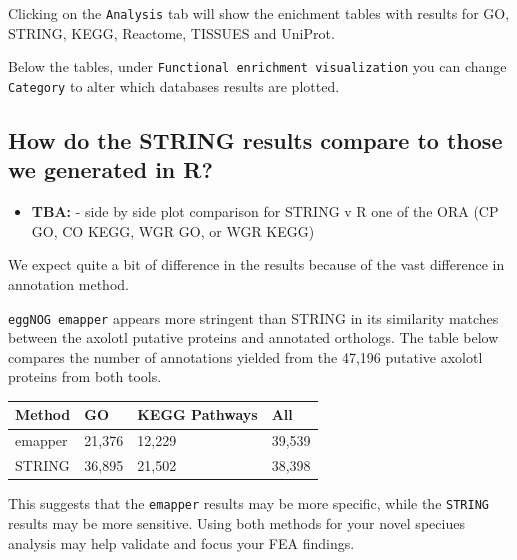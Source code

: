 \documentclass[
]{book}
\providecommand{\tightlist}{%
  \setlength{\itemsep}{0pt}\setlength{\parskip}{0pt}}
\begin{document}
Clicking on the \texttt{Analysis} tab will show the enichment tables with results for GO, STRING, KEGG, Reactome, TISSUES and UniProt.

Below the tables, under \texttt{Functional\ enrichment\ visualization} you can change \texttt{Category} to alter which databases results are plotted.

\hypertarget{how-do-the-string-results-compare-to-those-we-generated-in-r}{%
\subsection{How do the STRING results compare to those we generated in R?}\label{how-do-the-string-results-compare-to-those-we-generated-in-r}}

\begin{itemize}
\tightlist
\item
  \textbf{TBA:} - side by side plot comparison for STRING v R one of the ORA (CP GO, CO KEGG, WGR GO, or WGR KEGG)
\end{itemize}

We expect quite a bit of difference in the results because of the vast difference in annotation method.

\texttt{eggNOG\ emapper} appears more stringent than STRING in its similarity matches between the axolotl putative proteins and annotated orthologs. The table below compares the number of annotations yielded from the 47,196 putative axolotl proteins from both tools.

\begin{longtable}[]{@{}llll@{}}
\toprule\noalign{}
Method & GO & KEGG Pathways & All \\
\midrule\noalign{}
\endhead
\bottomrule\noalign{}
\endlastfoot
emapper & 21,376 & 12,229 & 39,539 \\
STRING & 36,895 & 21,502 & 38,398 \\
\end{longtable}

This suggests that the \texttt{emapper} results may be more specific, while the \texttt{STRING} results may be more sensitive. Using both methods for your novel speciues analysis may help validate and focus your FEA findings.

  
\end{document}

